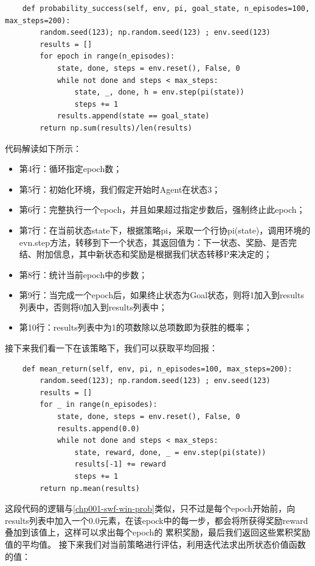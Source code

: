 \begin{lstlisting}
    def probability_success(self, env, pi, goal_state, n_episodes=100, max_steps=200):
        random.seed(123); np.random.seed(123) ; env.seed(123)
        results = []
        for epoch in range(n_episodes):
            state, done, steps = env.reset(), False, 0
            while not done and steps < max_steps:
                state, _, done, h = env.step(pi(state))
                steps += 1
            results.append(state == goal_state)
        return np.sum(results)/len(results)
\end{lstlisting}
代码解读如下所示：
\begin{itemize}
    \item 第4行：循环指定epoch数；
    \item 第5行：初始化环境，我们假定开始时Agent在状态3；
    \item 第6行：完整执行一个epoch，并且如果超过指定步数后，强制终止此epoch；
    \item 第7行：在当前状态state下，根据策略pi，采取一个行协pi(state)，调用环境的evn.step方法，转移到下一个状态，其返回值为：下一状态、奖励、是否完结、附加信息，其中新状态和奖励是根据我们状态转移P来决定的；
    \item 第8行：统计当前epoch中的步数；
    \item 第9行：当完成一个epoch后，如果终止状态为Goal状态，则将1加入到results列表中，否则将0加入到results列表中；
    \item 第10行：results列表中为1的项数除以总项数即为获胜的概率；
\end{itemize}
接下来我们看一下在该策略下，我们可以获取平均回报：
\begin{lstlisting}
    def mean_return(self, env, pi, n_episodes=100, max_steps=200):
        random.seed(123); np.random.seed(123) ; env.seed(123)
        results = []
        for _ in range(n_episodes):
            state, done, steps = env.reset(), False, 0
            results.append(0.0)
            while not done and steps < max_steps:
                state, reward, done, _ = env.step(pi(state))
                results[-1] += reward
                steps += 1
        return np.mean(results)
\end{lstlisting}
这段代码的逻辑与\ref{chp001-swf-win-prob}类似，只不过是每个epoch开始前，向results列表中加入一个0.0元素，在该epock中的每一步，都会将所获得奖励reward叠加到该值上，这样可以求出每个epoch的
累积奖励，最后我们返回这些累积奖励值的平均值。
接下来我们对当前策略进行评估，利用迭代法求出所状态价值函数的值：
